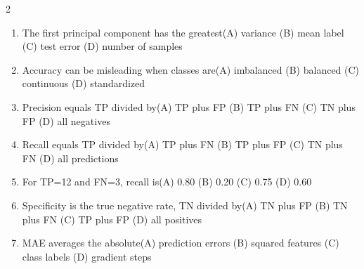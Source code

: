 \documentclass[a4paper]{article}
\begin{document}
\begin{multicols*}{2}
\fontsize{8.5}{10}\selectfont
\begin{enumerate}[resume]
\item The first principal component has the greatest\newline\hspace*{0.6em}(A) variance \quad (B) mean label \newline\hspace*{0.6em}(C) test error \quad (D) number of samples
\item Accuracy can be misleading when classes are\newline\hspace*{0.6em}(A) imbalanced \quad (B) balanced \newline\hspace*{0.6em}(C) continuous \quad (D) standardized
\item Precision equals TP divided by\newline\hspace*{0.6em}(A) TP plus FP \quad (B) TP plus FN \newline\hspace*{0.6em}(C) TN plus FP \quad (D) all negatives
\item Recall equals TP divided by\newline\hspace*{0.6em}(A) TP plus FN \quad (B) TP plus FP \newline\hspace*{0.6em}(C) TN plus FN \quad (D) all predictions
\item For TP=12 and FN=3, recall is\newline\hspace*{0.6em}(A) 0.80 \quad (B) 0.20 \newline\hspace*{0.6em}(C) 0.75 \quad (D) 0.60
\item Specificity is the true negative rate, TN divided by\newline\hspace*{0.6em}(A) TN plus FP \quad (B) TN plus FN \newline\hspace*{0.6em}(C) TP plus FP \quad (D) all positives
\item MAE averages the absolute\newline\hspace*{0.6em}(A) prediction errors \quad (B) squared features \newline\hspace*{0.6em}(C) class labels \quad (D) gradient steps

\end{enumerate}
\end{multicols*}
\end{document}
